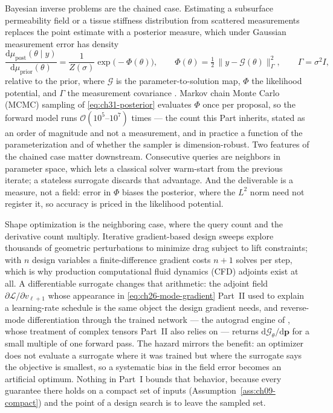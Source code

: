 Bayesian inverse problems are the chained case. Estimating a subsurface permeability field or a
tissue stiffness distribution from scattered measurements replaces the point estimate with a
posterior measure, which under Gaussian measurement error has density
\begin{equation}
  \label{eq:ch31-posterior}
  \frac{\mathrm{d}\mu_{\mathrm{post}}(\theta \mid y)}{\mathrm{d}\mu_{\mathrm{prior}}(\theta)}
  = \frac{1}{Z(\sigma)} \exp\bigl(-\Phi(\theta)\bigr), \qquad
  \Phi(\theta) = \tfrac{1}{2}\,\bigl\| y - \mathcal{G}(\theta) \bigr\|_{\Gamma}^{2}, \qquad
  \Gamma = \sigma^{2} I,
\end{equation}
relative to the prior, where $\mathcal{G}$ is the parameter-to-solution map, $\Phi$ the likelihood
potential, and $\Gamma$ the measurement covariance \cite{stuart2010inverse}. Markov chain Monte
Carlo (MCMC) sampling of \eqref{eq:ch31-posterior} evaluates $\Phi$ once per proposal, so the
forward model runs $\mathcal{O}(10^{5}\text{--}10^{7})$ times --- the count this Part inherits,
stated as an order of magnitude and not a measurement, and in
practice a function of the parameterization and of whether the sampler is
dimension-robust.
Two features of the chained case matter downstream. Consecutive queries are neighbors in
parameter space, which lets a classical solver warm-start from the previous iterate; a stateless
surrogate discards that advantage. And the deliverable is a measure, not a field: error in $\Phi$
biases the posterior, where the $L^{2}$ norm need not register it, so accuracy is priced in the
likelihood potential.

Shape optimization is the neighboring case, where the query count and the derivative count
multiply. Iterative gradient-based design sweeps explore thousands of geometric perturbations to
minimize drag subject to lift constraints; with $n$ design variables a finite-difference gradient
costs $n+1$ solves per step, which is why production computational fluid dynamics (CFD) adjoints
exist at all. A differentiable surrogate changes that
arithmetic: the adjoint field $\partial \mathcal{L}/\partial v_{\ell+1}$ whose appearance in
\eqref{eq:ch26-mode-gradient} Part~II used to explain a learning-rate schedule is the same object
the design gradient needs, and reverse-mode differentiation through the trained network --- the
autograd engine of \cite{paszke2019pytorch}, whose treatment of complex tensors Part~II also
relies on --- returns $\mathrm{d}\mathcal{G}_\theta/\mathrm{d}\mathbf{p}$ for a small multiple of
one forward pass. The hazard mirrors the benefit:
an optimizer does not evaluate a surrogate where it was trained
but where the surrogate says the objective is smallest, so a systematic bias in the field error
becomes an artificial optimum. Nothing in Part~I bounds that
behavior, because every guarantee there holds on a compact set of inputs
(Assumption~\ref{ass:ch09-compact}) and the point of a design search is to leave the sampled
set.

